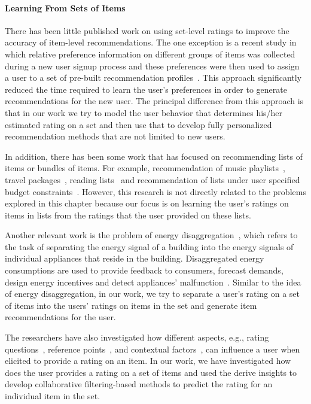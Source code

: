 \paragraph{Learning From Sets of Items}
There has been little published work on using set-level ratings to improve the
accuracy of item-level recommendations. The one exception is a recent study in which relative
preference information on different groups of items was collected during a new user
signup process and these preferences were then used to assign a user to a set of
pre-built recommendation profiles~\cite{r53}. 
This approach significantly reduced the time required to learn the user's
preferences in order to generate recommendations for the new user.
The principal difference from this 
approach is that in our work we try to model the user behavior that determines
his/her estimated rating on a set and then use that to develop fully
personalized recommendation methods that are not limited to new users.

In addition, there has been some work that  has focused on recommending
lists of items or bundles of items. For example, recommendation of music
playlists~\cite{r55,moore2012learning,aizenberg2012build}, travel
packages~\cite{interdonato2013versatile,r54,liu2011personalized,xie2011comprec}, reading
lists~\cite{r56} and recommendation of lists under user specified budget
constraints~\cite{xie2010breaking,BenouaretRecsys16}.
However, this research is not directly related to the problems explored in this
chapter because our focus is on learning the user's ratings on items in lists from
the ratings that the user provided on these lists.

Another relevant work is the problem of energy disaggregation~\cite{hart1992nonintrusive}, 
which refers to the task
of separating the energy signal of a building into the energy signals of
individual appliances that reside in the building. Disaggregated energy
consumptions are used to provide feedback to consumers,  forecast demands,
design energy incentives and detect appliances'
malfunction~\cite{froehlich2011disaggregated,darby2006effectiveness}. Similar to
the idea of energy disaggregation, in our work, we try to separate a user's rating on a set of
items into the users' ratings on items in the set and generate item
recommendations for the user.

The researchers have also investigated how different aspects, e.g., rating
questions~\cite{bellogin2014magic}, reference
points~\cite{adomavicius2011recommender,cosley2003seeing,nguyen2013rating}, and
contextual factors~\cite{Winoto2010RUM}, can influence a user when
elicited to provide a rating on an item. In our work, we have investigated how
does the user provides a rating on a set of items and used the derive insights to develop
collaborative filtering-based methods to predict the rating for an individual
item in the set.









